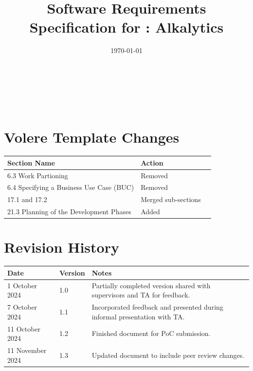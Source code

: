 \documentclass[12pt]{article}
\begin{document}
\title{Software Requirements Specification for \progname: Alkalytics} 
\author{\authname}
\date{\today}
	
\maketitle

~\newpage


\tableofcontents

~\newpage

\listoffigures
\listoftables

\section*{Volere Template Changes}
\begin{tabularx}{\textwidth}{p{8cm}p{4cm}X} \toprule
  {\textbf{Section Name}} & {\textbf{Action}}\\
  \midrule
  6.3 Work Partioning & Removed\\
  6.4 Specifying a Business Use Case (BUC) & Removed\\
  17.1 and 17.2 & Merged sub-sections\\
  21.3 Planning of the Development Phases & Added\\
  \bottomrule
\end{tabularx}

\newpage
\section*{Revision History}

  \begin{tabularx}{\textwidth}{p{4cm}p{1.5cm}X} \toprule {\textbf{Date}} &
  {\textbf{Version}} & {\textbf{Notes}}\\
  \midrule
  1 October 2024 & 1.0 & Partially completed version shared with supervisors and TA for feedback.\\
  7 October 2024 & 1.1 & Incorporated feedback and presented during informal presentation with TA.\\
  11 October 2024 & 1.2 & Finished document for PoC submission.\\
  11 November 2024 & 1.3 & Updated document to include peer review changes.\\
  \bottomrule
  \end{tabularx}

~\\
\end{document}

